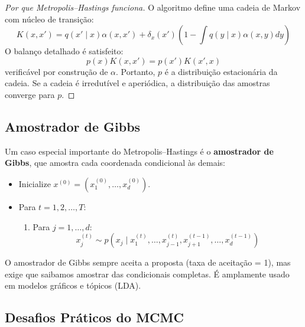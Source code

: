 \documentclass{tufte-handout}
\begin{document}
\begin{proof}[Por que Metropolis--Hastings funciona]
    O algoritmo define uma cadeia de Markov com núcleo de transição:
    \[
    K(x, x') = q(x' \mid x) \alpha(x, x') + \delta_x(x') \left(1 - \int q(y \mid x) \alpha(x, y) dy\right)
    \]
    O balanço detalhado é satisfeito:
    \[
    p(x) K(x, x') = p(x') K(x', x)
    \]
    verificável por construção de $\alpha$. Portanto, $p$ é a distribuição estacionária
    da cadeia. Se a cadeia é irredutível e aperiódica, a distribuição das amostras
    converge para $p$.
\end{proof}

\subsection{Amostrador de Gibbs}

Um caso especial importante do Metropolis--Hastings é o \textbf{amostrador de Gibbs},
que amostra cada coordenada condicional às demais:

\begin{algorithm}[h]
\caption{Amostrador de Gibbs}
\begin{itemize}
    \item Inicialize $x^{(0)} = (x_1^{(0)}, \dots, x_d^{(0)})$.
    \item Para $t = 1, 2, \dots, T$:
    \begin{enumerate}
        \item Para $j = 1, \dots, d$:
        \[
        x_j^{(t)} \sim p(x_j \mid x_1^{(t)}, \dots, x_{j-1}^{(t)}, x_{j+1}^{(t-1)}, \dots, x_d^{(t-1)})
        \]
    \end{enumerate}
\end{itemize}
\end{algorithm}

O amostrador de Gibbs sempre aceita a proposta (taxa de aceitação = 1), mas exige que
saibamos amostrar das condicionais completas. É amplamente usado em modelos gráficos
e tópicos (LDA).

\subsection{Desafios Práticos do MCMC}
\end{document}

